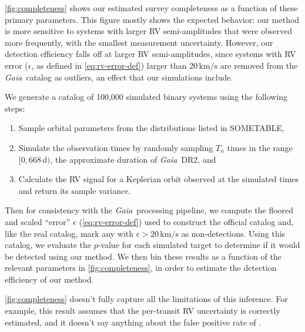 \documentclass[modern, letterpaper]{aastex631}
\newcommand{\project}[1]{\textsl{#1}}
\newcommand{\Gaia}{\project{Gaia}}
\begin{document}
\autoref{fig:completeness} shows our estimated survey completeness as a function of these primary parameters.
This figure mostly shows the expected behavior: our method is more sensitive to systems with larger RV semi-amplitudes that were observed more frequently, with the smallest measurement uncertainty.
However, our detection efficiency falls off at larger RV semi-amplitudes, since systems with RV error ($\epsilon$, as defined in \autoref{eq:rv-error-def}) larger than $20\,\mathrm{km/s}$ are removed from the \Gaia\ catalog as outliers, an effect that our simulations include.

We generate a catalog of 100,000 simulated binary systems using the following steps:
\begin{enumerate}
	\item Sample orbital parameters from the distributions listed in SOMETABLE,
	\item Simulate the observation times by randomly sampling $T_n$ times in the range $[0, 668\,\mathrm{d})$, the approximate duration of \Gaia\ DR2, and
	\item Calculate the RV signal for a Keplerian orbit observed at the simulated times and return its sample variance.
\end{enumerate}
Then for consistency with the \Gaia\ processing pipeline, we compute the floored and scaled ``error'' $\epsilon$ (\autoref{eq:rv-error-def}) used to construct the official catalog and, like the real catalog, mark any with $\epsilon > 20\,\mathrm{km/s}$ as non-detections.
Using this catalog, we evaluate the $p$-value for each simulated target to determine if it would be detected using our method.
We then bin these results as a function of the relevant parameters in \autoref{fig:completeness}, in order to estimate the detection efficiency of our method.

\autoref{fig:completeness} doesn't fully capture all the limitations of this inference.
For example, this result assumes that the per-transit RV uncertainty is correctly estimated, and it doesn't say anything about the false positive rate of .

\end{document}
